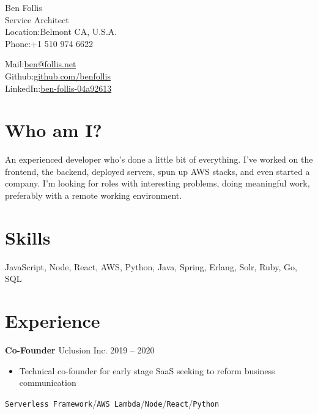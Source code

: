 \documentclass{res}
\begin{document}


{\huge Ben Follis}\\
{\huge Service Architect} \\%

Location:{Belmont CA, U.S.A.}\\
Phone:{+1 510 974 6622}\\
\vspace{-\baselineskip} %

Mail:{\href{mailto:ben@follis.net}{ben@follis.net}}\\
Github:{\href{https://github.com/benfollis}{github.com/benfollis}}\\
LinkedIn:{\href{https://www.linkedin.com/in/ben-follis-04a92613}{ben-follis-04a92613}}\\



\section{Who am I?}
An experienced developer who's done a little bit of everything. I've worked on the frontend, the backend, deployed servers, spun up AWS stacks, and even started a company. I'm looking for roles with interesting problems, doing meaningful work, preferably with a remote working environment.

\section{Skills}
JavaScript, Node, React, AWS, Python, Java, Spring, Erlang, Solr, Ruby, Go, SQL


\section{Experience}
        {\bf Co-Founder} \hfill Uclusion Inc. \hfill 2019 -- 2020
        \begin{itemize}
        \item Technical co-founder for early stage SaaS seeking to reform business communication
        \end{itemize}
        \texttt{Serverless Framework}\slash\texttt{AWS Lambda}\slash\texttt{Node}\slash\texttt{React}\slash\texttt{Python}\\
        
\end{document}
